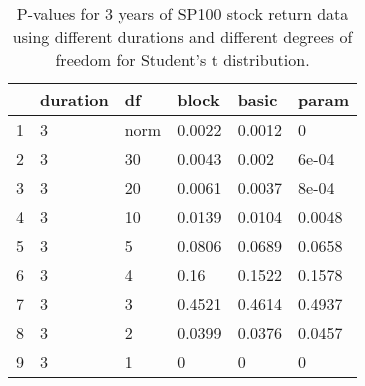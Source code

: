 \begin{table}[ht]
\centering
\caption{P-values for 3 years of SP100 stock return 
                   data using different durations
  and different degrees of freedom for Student's t distribution.} 
\label{table:SP1003}
\begin{tabular}{rlllll}
  \hline
 & duration & df & block & basic & param \\ 
  \hline
1 & 3 & norm & 0.0022 & 0.0012 & 0 \\ 
  2 & 3 & 30 & 0.0043 & 0.002 & 6e-04 \\ 
  3 & 3 & 20 & 0.0061 & 0.0037 & 8e-04 \\ 
  4 & 3 & 10 & 0.0139 & 0.0104 & 0.0048 \\ 
  5 & 3 & 5 & 0.0806 & 0.0689 & 0.0658 \\ 
  6 & 3 & 4 & 0.16 & 0.1522 & 0.1578 \\ 
  7 & 3 & 3 & 0.4521 & 0.4614 & 0.4937 \\ 
  8 & 3 & 2 & 0.0399 & 0.0376 & 0.0457 \\ 
  9 & 3 & 1 & 0 & 0 & 0 \\ 
   \hline
\end{tabular}
\end{table}

